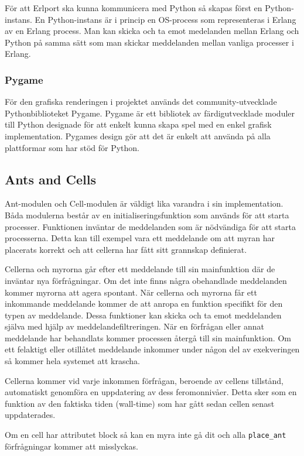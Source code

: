 \documentclass[12pt]{article}
\begin{document}
För att Erlport ska kunna kommunicera med Python så skapas först en Python-instans.
En Python-instans är i princip en OS-process som representeras i Erlang av en Erlang process.
Man kan skicka och ta emot medelanden mellan Erlang och Python på samma sätt som man skickar meddelanden mellan vanliga processer i Erlang.

\subsubsection{Pygame}
För den grafiska renderingen i projektet används det community-utvecklade Pythonbiblioteket Pygame.
Pygame är ett bibliotek av färdigutvecklade moduler till Python designade för att enkelt kunna skapa spel med en enkel grafisk implementation.
Pygames design gör att det är enkelt att använda på alla plattformar som har stöd för Python.

\subsection{Ants and Cells}
Ant-modulen och Cell-modulen är väldigt lika varandra i sin implementation.
Båda modulerna består av en initialiseringsfunktion som används för att starta processer.
Funktionen inväntar de meddelanden som är nödvändiga för att starta processerna.
Detta kan till exempel vara ett meddelande om att myran har placerats korrekt och att cellerna har fått sitt grannskap definierat.

Cellerna och myrorna går efter ett meddelande till sin mainfunktion där de inväntar nya förfrågningar.
Om det inte finns några obehandlade meddelanden kommer myrorna att agera spontant.
När cellerna och myrorna får ett inkommande meddelande kommer de att anropa en funktion specifikt för den typen av meddelande.
Dessa funktioner kan skicka och ta emot meddelanden själva med hjälp av meddelandefiltreringen.
När en förfrågan eller annat meddelande har behandlats kommer processen återgå till sin mainfunktion.
Om ett felaktigt eller otillåtet meddelande inkommer under någon del av exekveringen så kommer hela systemet att krascha.

Cellerna kommer vid varje inkommen förfrågan,
beroende av cellens tillstånd,
automatiskt genomföra en uppdatering av dess feromonnivåer.
Detta sker som en funktion av den faktiska tiden (wall-time) som har gått sedan cellen senast uppdaterades.

Om en cell har attributet block så kan en myra inte gå dit och alla \texttt{place\_ant} förfrågningar kommer att misslyckas.
\end{document}
